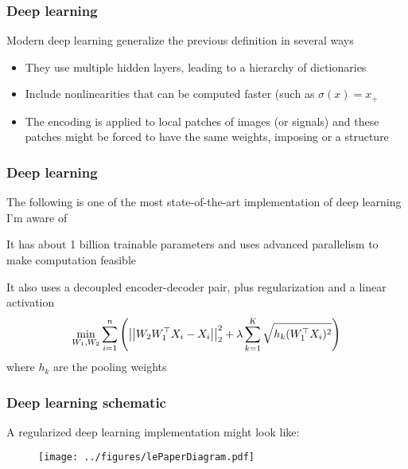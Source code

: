 \documentclass[12pt]{beamer}
\begin{document}
\begin{frame}[fragile]
\frametitle{Deep learning}
Modern deep learning generalize the previous definition in several ways

\begin{itemize}
\item They use multiple hidden layers, leading to a hierarchy of dictionaries
\item Include nonlinearities that can be computed faster (such as $\sigma(x) = x_+$
\item The encoding is applied to local patches of images (or signals) and these patches might
be forced to have the same weights, imposing  or a  structure
\end{itemize}
\end{frame}

\begin{frame}[fragile]
\frametitle{Deep learning}
The following is one of the most state-of-the-art implementation of deep learning I'm aware of


\vsp
It has about 1 billion trainable parameters and uses advanced parallelism to make computation feasible

\vsp
It also uses a decoupled encoder-decoder pair, plus regularization and a linear activation
\[
\min_{W_1,W_2} \sum_{i=1}^n 
\left( \left|\left| W_2 W_1^{\top} X_i - X_i \right|\right|_2^2 + \lambda \sum_{k=1}^K \sqrt{ h_k(W_1^{\top} X_i)^2}\right)
\]
where $h_k$ are the pooling weights

\end{frame}

\begin{frame}[fragile]
\frametitle{Deep learning schematic}
A regularized deep learning implementation might look like:
\begin{figure}
\centering
\texttt{[image: ../figures/lePaperDiagram.pdf]}
\end{figure}
\end{frame}
\end{document}
